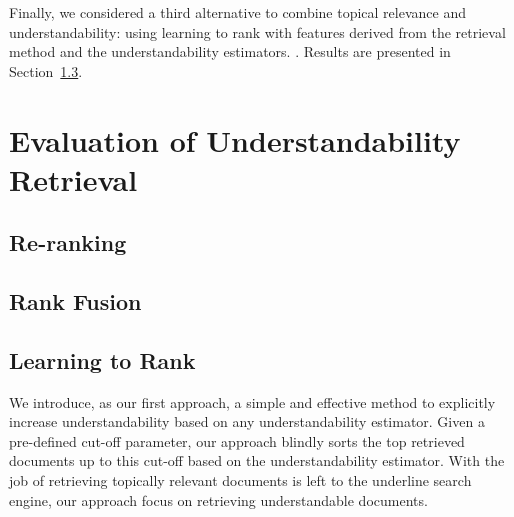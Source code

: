 Finally, we considered a third alternative to combine topical relevance and understandability: using learning to rank with features derived from the retrieval method and the understandability estimators. . Results are presented in Section~\ref{results:ltr}.


\section{Evaluation of Understandability Retrieval}
\subsection{Re-ranking}
\label{results:reranking}

\subsection{Rank Fusion}
\label{results:fusion}

\subsection{Learning to Rank}
\label{results:ltr}


%
%
%

We introduce, as our first approach, a simple and effective method to explicitly increase understandability based on any understandability estimator. 
Given a pre-defined cut-off parameter, our approach blindly sorts the top retrieved documents up to this cut-off based on the understandability estimator.
With the job of retrieving topically relevant documents is left to the underline search engine, our approach focus on retrieving understandable documents.

